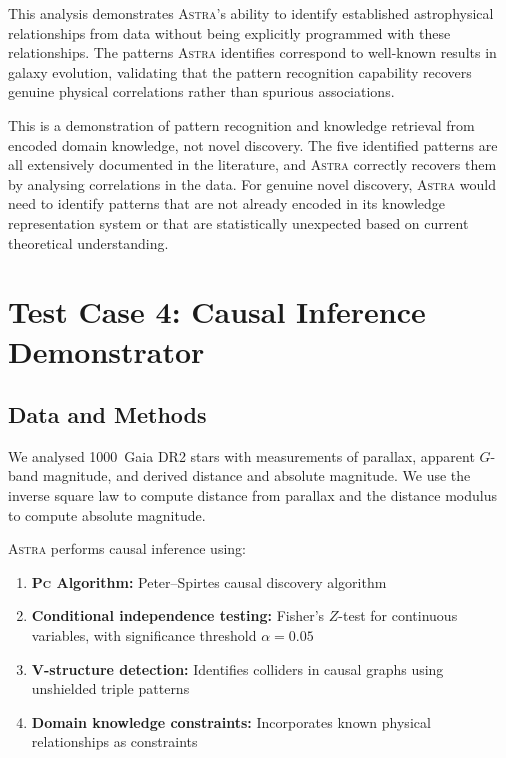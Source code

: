 \documentclass[fleqn,usenatbib]{mnras}
\newcommand{\astra}{\textsc{Astra}\xspace}
\newcommand{\pc}{\textsc{Pc}\xspace}
\begin{document}
This analysis demonstrates \astra's ability to identify established astrophysical relationships from data without being explicitly programmed with these relationships.
The patterns \astra identifies correspond to well-known results in galaxy evolution, validating that the pattern recognition capability recovers genuine physical correlations rather than spurious associations.

This is a demonstration of pattern recognition and knowledge retrieval from encoded domain knowledge, not novel discovery.
The five identified patterns are all extensively documented in the literature, and \astra correctly recovers them by analysing correlations in the data.
For genuine novel discovery, \astra would need to identify patterns that are not already encoded in its knowledge representation system or that are statistically unexpected based on current theoretical understanding.

\section{Test Case 4: Causal Inference Demonstrator}
\label{sec:tc4}

\subsection{Data and Methods}
\label{sec:tc4:data}

We analysed 1000~Gaia DR2 stars \citep{GaiaCollaboration2018} with measurements of parallax, apparent $G$-band magnitude, and derived distance and absolute magnitude.
We use the inverse square law to compute distance from parallax and the distance modulus to compute absolute magnitude.

\astra performs causal inference using:
\begin{enumerate}
  \item[(i)] \textbf{\pc Algorithm:} Peter--Spirtes causal discovery algorithm \citep{Spirtes2000}
  \item[(ii)] \textbf{Conditional independence testing:} Fisher's $Z$-test for continuous variables, with significance threshold $\alpha = 0.05$
  \item[(iii)] \textbf{V-structure detection:} Identifies colliders in causal graphs using unshielded triple patterns
  \item[(iv)] \textbf{Domain knowledge constraints:} Incorporates known physical relationships as constraints
\end{enumerate}
\end{document}
